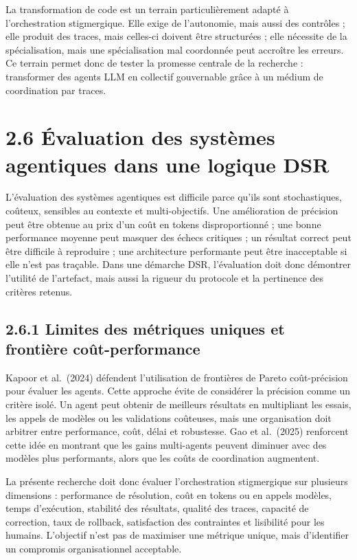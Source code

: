 La transformation de code est un terrain particulièrement adapté à l'orchestration stigmergique. Elle exige de l'autonomie, mais aussi des contrôles ; elle produit des traces, mais celles-ci doivent être structurées ; elle nécessite de la spécialisation, mais une spécialisation mal coordonnée peut accroître les erreurs. Ce terrain permet donc de tester la promesse centrale de la recherche : transformer des agents LLM en collectif gouvernable grâce à un médium de coordination par traces.

\section{2.6 Évaluation des systèmes agentiques dans une logique DSR}\label{uxe9valuation-des-systuxe8mes-agentiques-dans-une-logique-dsr}

L'évaluation des systèmes agentiques est difficile parce qu'ils sont stochastiques, coûteux, sensibles au contexte et multi-objectifs. Une amélioration de précision peut être obtenue au prix d'un coût en tokens disproportionné ; une bonne performance moyenne peut masquer des échecs critiques ; un résultat correct peut être difficile à reproduire ; une architecture performante peut être inacceptable si elle n'est pas traçable. Dans une démarche DSR, l'évaluation doit donc démontrer l'utilité de l'artefact, mais aussi la rigueur du protocole et la pertinence des critères retenus.

\subsection{2.6.1 Limites des métriques uniques et frontière coût-performance}\label{limites-des-muxe9triques-uniques-et-frontiuxe8re-couxfbt-performance}

Kapoor et al.~(2024) défendent l'utilisation de frontières de Pareto coût-précision pour évaluer les agents. Cette approche évite de considérer la précision comme un critère isolé. Un agent peut obtenir de meilleurs résultats en multipliant les essais, les appels de modèles ou les validations coûteuses, mais une organisation doit arbitrer entre performance, coût, délai et robustesse. Gao et al.~(2025) renforcent cette idée en montrant que les gains multi-agents peuvent diminuer avec des modèles plus performants, alors que les coûts de coordination augmentent.

La présente recherche doit donc évaluer l'orchestration stigmergique sur plusieurs dimensions : performance de résolution, coût en tokens ou en appels modèles, temps d'exécution, stabilité des résultats, qualité des traces, capacité de correction, taux de rollback, satisfaction des contraintes et lisibilité pour les humains. L'objectif n'est pas de maximiser une métrique unique, mais d'identifier un compromis organisationnel acceptable.

